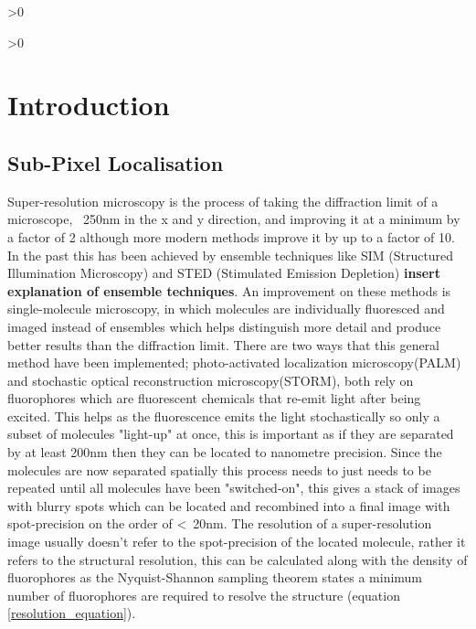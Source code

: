 \documentclass[aps,pra,a4paper,nofootinbib,onecolumn,tightenlines,longbibliography,12pt,amsfonts,amssymb,amsmath,floatfix]{revtex4-2} %
\begin{document}
\newpage
\tableofcontents %
\makeatletter
\let\toc@pre\relax
\let\toc@post\relax
\makeatother

\ifnum\totalfigures>0
\newpage
\listoffigures
{}
\fi

\ifnum\totaltables>0
\newpage
\listoftables
{}
\fi





\newpage
{}

\section{Introduction}

  \subsection{Sub-Pixel Localisation} %
  \label{sub:spot-finding intro}
  
  Super-resolution microscopy is the process of taking the diffraction limit 
  of a microscope, ~250nm in the x and y direction, and improving it at a minimum by a 
  factor of 2 although more modern methods improve it by up to a factor of 10. In the past this has been achieved by ensemble techniques
  like SIM (Structured Illumination Microscopy) and STED (Stimulated Emission Depletion)
  \textbf{insert explanation of ensemble techniques}. An improvement on these methods 
  is single-molecule microscopy, in which molecules are individually fluoresced and 
  imaged instead of ensembles which helps distinguish more detail and produce better
  results than the diffraction limit.
  There are two ways that this general method have been implemented; photo-activated localization
  microscopy(PALM) and stochastic optical reconstruction microscopy(STORM), both
  rely on fluorophores which are fluorescent chemicals that re-emit light after
  being excited. This helps as the fluorescence emits the light 
  stochastically so only a subset of molecules "light-up" at once, this is important 
  as if they are separated by at least 200nm then they can be located to nanometre precision. 
  Since the molecules are now separated spatially this process needs to just needs to be repeated 
  until all molecules have been "switched-on", this gives a stack of images with blurry spots
  which can be located and recombined into a final image with spot-precision on the order of <~20nm.\cite{galbraith2011super}
  The resolution of a super-resolution image usually doesn't refer to the spot-precision of the 
  located molecule, rather it refers to the structural resolution, this can be calculated along 
  with the density of fluorophores as the Nyquist-Shannon sampling theorem states a minimum number 
  of fluorophores are required to resolve the structure (equation \ref{resolution_equation}). \cite{van2011single}\cite{shannon1949communication}
\end{document}

